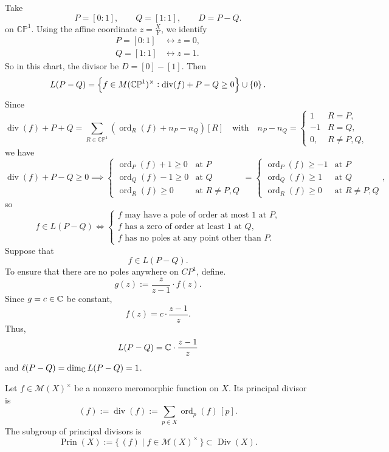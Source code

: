\documentclass[11pt,openany]{article}
\newcommand{\ord}{\operatorname{ord}}
\newcommand{\CP}{\mathbb{CP}}
\newcommand{\Div}{\operatorname{Div}}
\renewcommand{\div}{\operatorname{div}}
\newcommand{\Prin}{\operatorname{Prin}}
\begin{document}
\newpage
\begin{example}
Take \[
P=[0:1], \qquad Q=[1:1], \qquad D=P-Q.
\] on $\mathbb{CP}^1$. Using the affine coordinate $z=\frac{X}{Y}$, we identify \begin{align*}
	P=[0:1]&\leftrightarrow z=0,\\
	Q=[1:1]&\leftrightarrow z=1.
\end{align*} So in this chart, the divisor be $D=[0]-[1]$. Then \begin{align*}
L(P-Q)=\set{f\in M(\CP^1)^\times:\div(f)+P-Q\geq 0}\cup\set{0}.
\end{align*} Since \[
\div(f)+P+Q=\sum_{R\in\CP^1}(\ord_R(f)+n_P-n_Q)[R]\quad\text{with}\quad n_P-n_Q=\begin{cases}
	1 & R=P,\\
	-1 & R=Q,\\
	0, &R\neq P,Q,
\end{cases}
\] we have \[
\div(f)+P-Q\geq 0\implies \begin{cases}
	\ord_{P}(f)+1\geq 0 &\text{at $P$} \\
	\ord_{Q}(f)-1\geq 0 &\text{at $Q$} \\
	\ord_{R}(f)\geq 0 &\text{at $R\neq P,Q$}
\end{cases}=\begin{cases}
	\ord_{P}(f)\geq -1 &\text{at $P$} \\
	\ord_{Q}(f)\geq 1 &\text{at $Q$} \\
	\ord_{R}(f)\geq 0 &\text{at $R\neq P,Q$}
\end{cases},
\] so \[
f\in L(P-Q)\iff \begin{cases}
\text{$f$ may have a pole of order at most $1$ at $P$,}\\
\text{$f$ has a zero of order at least $1$ at $Q$,}\\
\text{$f$ has no poles at any point other than $P$.}
\end{cases}
\]
Suppose that \[
f\in L(P-Q).
\] To ensure that there are no poles anywhere on $CP^1$, define. \[
g(z):=\frac{z}{z-1}\cdot f(z).
\] Since $g=c\in\mathbb{C}$ be constant, \[
f(z)=c\cdot\frac{z-1}{z}.
\] Thus, \[
L(P-Q)=\mathbb{C}\cdot\frac{z-1}{z}
\] and $\ell(P-Q)=\dim_{\mathbb{C}}L(P-Q)=1$.
\end{example}

\newpage
\begin{definition}
	Let \(f\in \mathcal M(X)^\times\) be a nonzero meromorphic function on \(X\). Its
	principal divisor is
	\[
	(f):=\div(f):=\sum_{p\in X}\ord_p(f)\,[p].
	\]
	The subgroup of principal divisors is
	\[
	\Prin(X):=\{\, (f)\mid f\in \mathcal M(X)^\times\,\}\subset \Div(X).
	\]
\end{definition}
\end{document}
